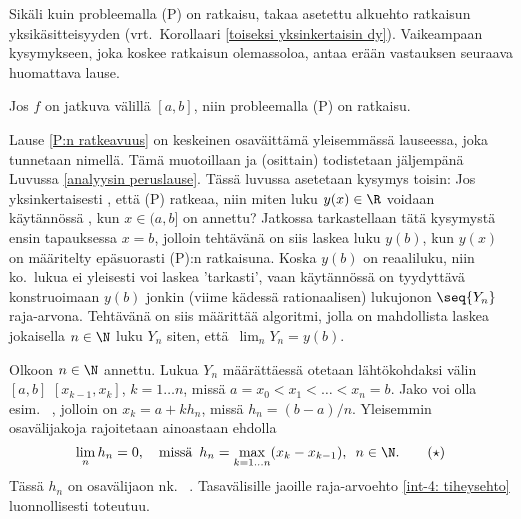 Sikäli kuin probleemalla (P) on ratkaisu, takaa asetettu alkuehto ratkaisun
yksikäsitteisyyden (vrt.\ Korollaari \ref{toiseksi yksinkertaisin dy}). Vaikeampaan
kysymykseen, joka koskee ratkaisun olemassoloa, antaa erään vastauksen seuraava huomattava
lause.
\begin{*Lause} \label{P:n ratkeavuus} Jos $f$ on jatkuva välillä $[a,b]$, niin probleemalla
(P) on ratkaisu.
\end{*Lause}
Lause \ref{P:n ratkeavuus} on keskeinen osaväittämä yleisemmässä lauseessa, joka tunnetaan
 nimellä. Tämä muotoillaan ja (osittain) todistetaan jäljempänä
Luvussa \ref{analyysin peruslause}. Tässä luvussa asetetaan kysymys toisin: Jos yksinkertaisesti
, että (P) ratkeaa, niin miten luku $y(x)\in\R$ voidaan käytännössä
, kun $x\in(a,b]$ on annettu? Jatkossa tarkastellaan tätä kysymystä ensin
tapauksessa $x=b$, jolloin tehtävänä on siis laskea luku $y(b)$, kun $y(x)$ on määritelty
epäsuorasti (P):n ratkaisuna. Koska $y(b)$ on reaaliluku, niin ko.\ lukua ei yleisesti voi
laskea 'tarkasti', vaan käytännössä on tyydyttävä konstruoimaan $y(b)$ jonkin (viime kädessä
rationaalisen) lukujonon $\seq{Y_n}$ raja-arvona. Tehtävänä on siis määrittää algoritmi, jolla
on mahdollista laskea jokaisella $n\in\N$ luku $Y_n$ siten, että $\,\lim_nY_n=y(b)$.

Olkoon $n\in\N$ annettu. Lukua $Y_n$ määrättäessä otetaan lähtökohdaksi välin $[a,b]$
%
 $[x_{k-1},x_k]$, $k=1 \ldots n$, missä 
$a = x_0 < x_1 < \ldots < x_n = b$. Jako voi olla esim.\ 
%
, jolloin on
$x_k=a+kh_n$, missä $h_n=(b-a)/n$. Yleisemmin osavälijakoja rajoitetaan ainoastaan ehdolla
\begin{equation} \label{int-4: tiheysehto}
\lim_nh_n=0, \quad \text{missä}\,\ h_n = \max_{k=1 \ldots n} (x_k-x_{k-1}),\,\ n\in\N.
                                                                       \tag{$\star$}
\end{equation}
Tässä $h_n$ on osavälijaon nk.\ 
%
. Tasavälisille jaoille raja-arvoehto
\eqref{int-4: tiheysehto} luonnollisesti toteutuu.

